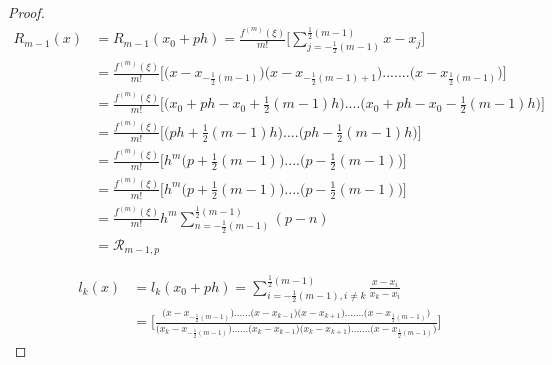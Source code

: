 \documentclass{article}
\begin{document}
\begin{proof}
\begin{equation}   \label{remainder_final}
\begin{split}
R_{m-1}(x) &=  R_{m-1}(x_0 + ph)  
    =\frac{ f^{(m)}(\xi) }{ m! }
        \bigg[  
        \sum_{j = -\frac{1}{2}(m-1) }^{ \frac{1}{2}(m-1) } 
        x-x_j
        \bigg] 
    \\
    &=\frac{ f^{(m)}(\xi) }{ m! }
        \bigg[  
        \Big(x - x_{-\frac{1}{2}(m-1)} \Big)
        \Big(x - x_{-\frac{1}{2}(m-1)+1} \Big)
        .......
        \Big(x - x_{\frac{1}{2}(m-1)} \Big)
        \bigg]  
    \\
    &=\frac{ f^{(m)}(\xi) }{ m! }
        \bigg[  
            \Big(
            x_0 +ph -x_0 + \frac{1}{2}(m-1)h
            \Big)
            ....
            \Big(
            x_0 +ph -x_0 - \frac{1}{2}(m-1)h
            \Big)
        \bigg] 
    \\
    &=\frac{ f^{(m)}(\xi) }{ m! }
        \bigg[  
            \Big(
            ph + \frac{1}{2}(m-1)h
            \Big)
            ....
            \Big(
            ph- \frac{1}{2}(m-1)h
            \Big)
        \bigg] 
    \\
    &=\frac{ f^{(m)}(\xi) }{ m! }
        \bigg[  
            h^{m}
            \Big(
            p + \frac{1}{2}(m-1)
            \Big)
            ....
            \Big(
            p- \frac{1}{2}(m-1)
            \Big)
        \bigg] 
    \\
    &=\frac{ f^{(m)}(\xi) }{ m! }
        \bigg[  
            h^{m}
            \Big(
            p + \frac{1}{2}(m-1)
            \Big)
            ....
            \Big(
            p- \frac{1}{2}(m-1)
            \Big)
        \bigg] 
    \\
    &=\frac{ f^{(m)}(\xi) }{ m! } h^{m}
      \sum_{n = -\frac{1}{2}(m-1)}^{\frac{1}{2}(m-1)}
      (p-n)
    \\
    &=\mathcal{R}_{m-1,p}
\end{split}
\end{equation}



\begin{equation*}
\begin{split}
    l_k(x) &=  l_k( x_0 + ph ) =
    \sum_{i = -\frac{1}{2}(m-1) , i \neq k}^{\frac{1}{2}(m-1)} 
    \frac{x - x_i}{x_k - x_i} 
    \\
    &=\Bigg[\frac{
        \big(x  - x_{-\frac{1}{2}(m-1)} \big)
        ......
        \big(x  - x_{k-1} \big)
        \big(x  - x_{k+1} \big)
        .......
        \big(x - x_{\frac{1}{2}(m-1)} \big)
    }{
        \big(x_k - x_{-\frac{1}{2}(m-1)} \big)
        ......
        \big(x_k  - x_{k-1} \big)
        \big(x_k  - x_{k+1} \big)
        .......
        \big(x - x_{\frac{1}{2}(m-1)} \big)
    }
    \Bigg]
\end{split}
\end{equation*}


\end{proof}
\end{document}
